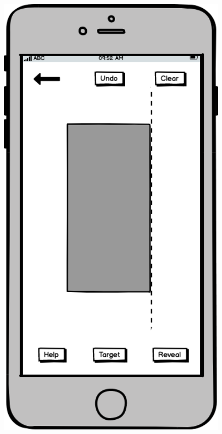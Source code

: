\documentclass[11pt]{article}
\begin{document}
\begin{figure}
\begin{minipage}[c]{0.35\textwidth}
                \includegraphics[width=1\textwidth]{Images/Prototype/prototypeMatchPatternCreate}
                \end{minipage}
            \end{figure}
\end{document}
